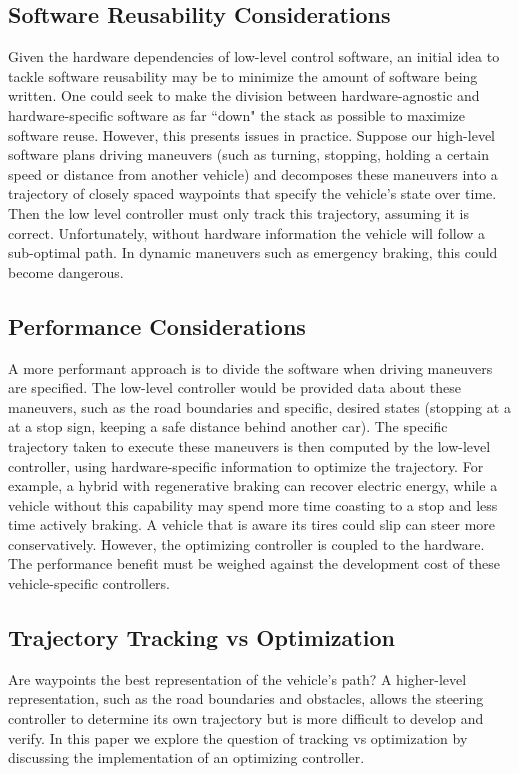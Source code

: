 \documentclass[conference]{IEEEtran}
\begin{document}
\subsection*{Software Reusability Considerations}
Given the hardware dependencies of low-level control software, an initial idea to tackle software reusability may be to minimize the amount of software being written. One could seek to make the division between hardware-agnostic and hardware-specific software as far ``down" the stack as possible to maximize software reuse. However, this presents issues in practice. Suppose our high-level software plans driving maneuvers (such as turning, stopping, holding a certain speed or distance from another vehicle) and decomposes these maneuvers into a trajectory of closely spaced waypoints that specify the vehicle's state over time. Then the low level controller must only track this trajectory, assuming it is correct. Unfortunately, without hardware information the vehicle will follow a sub-optimal path. In dynamic maneuvers such as emergency braking, this could become dangerous.

\subsection*{Performance Considerations}
A more performant approach is to divide the software when driving maneuvers are specified. The low-level controller would be provided data about these maneuvers, such as the road boundaries and specific, desired states (stopping at a at a stop sign, keeping a safe distance behind another car). The specific trajectory taken to execute these maneuvers is then computed by the low-level controller, using hardware-specific information to optimize the trajectory. For example, a hybrid with regenerative braking can recover electric energy, while a vehicle without this capability may spend more time coasting to a stop and less time actively braking. A vehicle that is aware its tires could slip can steer more conservatively. However, the optimizing controller is coupled to the hardware. The performance benefit must be weighed against the development cost of these vehicle-specific controllers.

\subsection*{Trajectory Tracking vs Optimization} Are waypoints the best representation of the vehicle's path? A higher-level representation, such as the road boundaries and obstacles, allows the steering controller to determine its own trajectory but is more difficult to develop and verify. In this paper we explore the question of tracking vs optimization by discussing the implementation of an optimizing controller.
\end{document}
